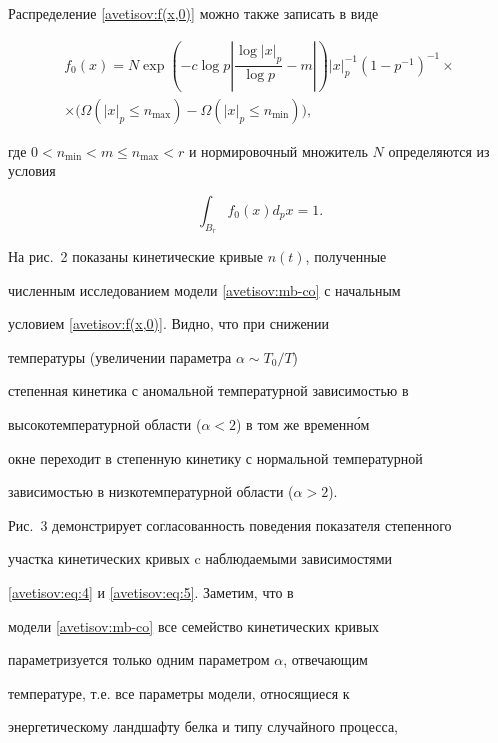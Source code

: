 Распределение \eqref{avetisov:f(x,0)} можно также записать в виде

\begin{multline*}

f_{0}(x)=N\exp \left(-c\log p\left|\dfrac{\log|x|_{p}}{\log

p}-m\right|\right)|x|_{p}^{-1}\left(1-p^{-1}\right)^{-1}\times\\

\times\bigl(\Omega\left(|x|_{p}\leq

n_{\max}\right)-\Omega\left(|x|_{p}\leq n_{\min}\right)\bigr),

\end{multline*}

где $0<n_{\min}<m\leq n_{\max}<r$ и нормировочный множитель $N$ определяются из условия

\[

\int_{B_{r}}f_{0}(x)d_{p}x=1.

\]







На рис.~2 показаны кинетические кривые $n(t)$, полученные

численным исследованием модели  \eqref{avetisov:mb-co} с начальным

условием \eqref{avetisov:f(x,0)}. Видно, что при снижении

температуры (увеличении параметра $\alpha\sim{T_0}/{T}$)

степенная кинетика с аномальной температурной зависимостью в

высокотемпературной области ($\alpha<2$)  в том же временн\'ом

окне переходит в степенную кинетику с нормальной температурной

зависимостью в низкотемпературной области  ($\alpha>2$). 

Рис.~3 демонстрирует согласованность поведения показателя степенного

участка кинетических кривых c наблюдаемыми зависимостями

\eqref{avetisov:eq:4} и \eqref{avetisov:eq:5}. Заметим, что в

модели \eqref{avetisov:mb-co} все семейство кинетических кривых

параметризуется только одним параметром $\alpha$, отвечающим

температуре, т.е. все параметры модели, относящиеся к

энергетическому ландшафту белка и типу случайного процесса,

